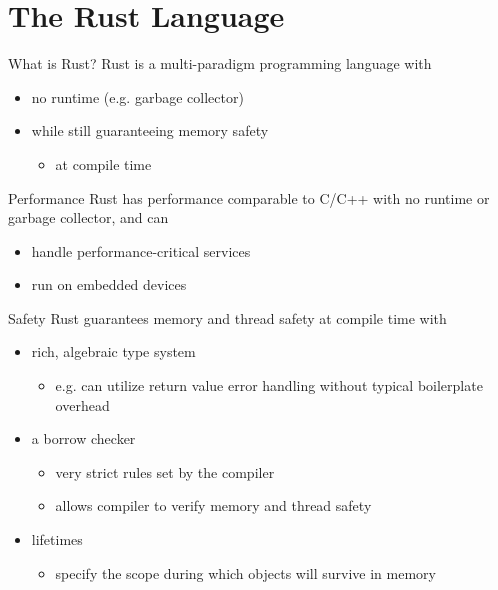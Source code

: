 \section{The Rust Language}
\begin{frame}{What is Rust?}
    \pause Rust is a multi-paradigm programming language with
    \pause
    \begin{itemize}[<+->]
        \item no runtime (e.g. garbage collector)
        \item while still guaranteeing memory safety
        \begin{itemize}[<+->]
            \item \alert{at compile time}
        \end{itemize}
    \end{itemize}
\end{frame}

\begin{frame}{Performance}
    \pause
    Rust has performance comparable to C/C++ with no runtime or garbage
    collector, and can
    \pause
    \begin{itemize}[<+->]
        \item handle performance-critical services
        \item run on embedded devices
    \end{itemize}
\end{frame}

\begin{frame}{Safety}
    \pause
    Rust guarantees memory and thread safety \alert{at compile time} with
    \pause
    \begin{itemize}[<+->]
        \item rich, algebraic type system
        \begin{itemize}[<+->]
            \item e.g. can utilize return value error handling without typical
                  boilerplate overhead
        \end{itemize}
        \item a borrow checker
        \begin{itemize}[<+->]
            \item very strict rules set by the compiler
            \item allows compiler to verify memory and thread safety
        \end{itemize}
        \item lifetimes
        \begin{itemize}[<+->]
            \item specify the scope during which objects will survive in memory
        \end{itemize}
    \end{itemize}
\end{frame}

